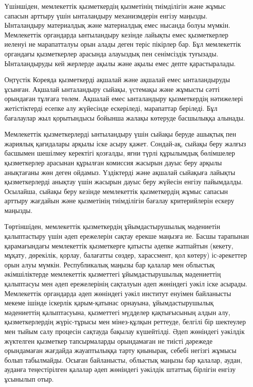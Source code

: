 \begin{multicols}{2}
Үшіншіден, мемлекеттік қызметкердің қызметінің тиімділігін және жұмыс
сапасын арттыру үшін ынталандыру механизмдерін енгізу маңызды.
Ынталандыру материалдық және материалдық емес нысанда болуы мүмкін.
Мемлекеттік органдарда ынтыландыру кезінде лайықты емес қызметкерлер
иеленуі не марапатталуы орын алады деген теріс пікірлер бар. Бұл
мемлекеттік органдағы қызметкерлер арасында алауыздық пен сенімсіздік
туғызады. Ынталандыруды кей жерлерде ақылы және ақылы емес депте
қарастыралады.

Оңтүстік Кореяда қызметкерді ақшалай және ақшалай емес ынталандыруды
ұсынған. Ақшалай ынталандыру сыйақы, үстемақы және жұмысты сәтті
орындаған тұлғаға төлем. Ақшалай емес ынталандыру қызметкердің
нәтижелері жетістіктерді есепке алу жүйесінде ескеріледі, марапаттар
беріледі. Бұл бағалаулар жыл қорытындысы бойынша жалақы көтеруде
басшылыққа алынады.

Мемлекеттік қызметкерлерді ынтыландыру үшін сыйақы беруде ашықтық пен
жариялық қағидалары арқылы іске асыру қажет. Сондай-ақ, сыйақы беру
жалғыз басшымен шешілмеу керектігі қозғалды, яғни түрлі құрылымдық
бөлімшелер қызметкерлер арасынан құрылған комиссия жасырын дауыс беру
арқылы анықтағаны жөн деген ойдамыз. Үздіктерді және ақшалай сыйақыға
лайықты қызметкерлерді анықтау үшін жасырын дауыс беру жүйесін енгізу
пайымдалды. Осылайша, сыйақы беру кезінде мемлекеттік қызметкердің жұмыс
сапасын арттыру жағдайын және қызметінің тиімділігін бағалау
критерийлерін ескеру маңызды.

Төртіншіден, мемлекеттік қызметкердің ұйымдастырушылық мәдениетін
қалыптастыру үшін әдеп ережелерін сақтау ерекше маңызға ие. Басшы
тарапынан қарамағындағы мемлекеттік қызметкерге қатысты әдепке жатпайтын
(кекету, мұқату, дөрекілік, қорлау, балағатты сөздер, харассмент, қол
көтеру) іс-әрекеттер орын алуы мүмкін. Республикалық маңызы бар қалалар
мен облыстық әкімшіліктерде мемлекеттік қызметтегі ұйымдастырушылық
мәдениеттің қалыптасуы мен әдеп ережелерінің сақталуын әдеп жөніндегі
уәкіл іске асырады. Мемлекеттік органдарда әдеп жөніндегі уәкіл институт
енуімен байланысты мекеме ішінде іскерлік қарым-қатынас орнауына,
ұйымдастырушылық мәдениеттің қалыптасуына, қызметтегі мүдделер
қақтығысының алдын алу, қызметкерлердің жүріс-тұрысы мен мінез-құлқын
реттеуде, белгілі бір шектеулер мен тыйым салу процесін сақтауда бақылау
күшейтілді. Әдеп жөніндегі уәкілдік жүктелген қызметкер тапсырмаларды
орындамаған не тиісті дәрежеде орындамаған жағдайда жауаптылыққа тарту
қиынырақ, себебі негізгі жұмысы болып табылмайды. Осыған байланысты,
облыстық маңызы бар қалалар, аудан, ауданға теңестірілген қалалар әдеп
жөніндегі уәкілдік штаттық бірлігін енгізу ұсынылып отыр.


\end{multicols}
